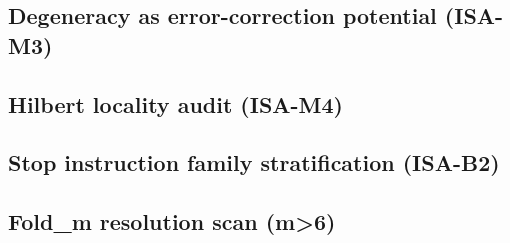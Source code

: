 \noindent

\subsection{Degeneracy as error-correction potential (ISA-M3)}

\noindent

\subsection{Hilbert locality audit (ISA-M4)}

\noindent

\subsection{Stop instruction family stratification (ISA-B2)}

\noindent

\subsection{Fold\_m resolution scan (m>6)}

\noindent

\noindent

\noindent

\medskip

\noindent

\medskip

\noindent

\medskip

\noindent

\medskip

\noindent

\medskip

\noindent

\medskip

\noindent

